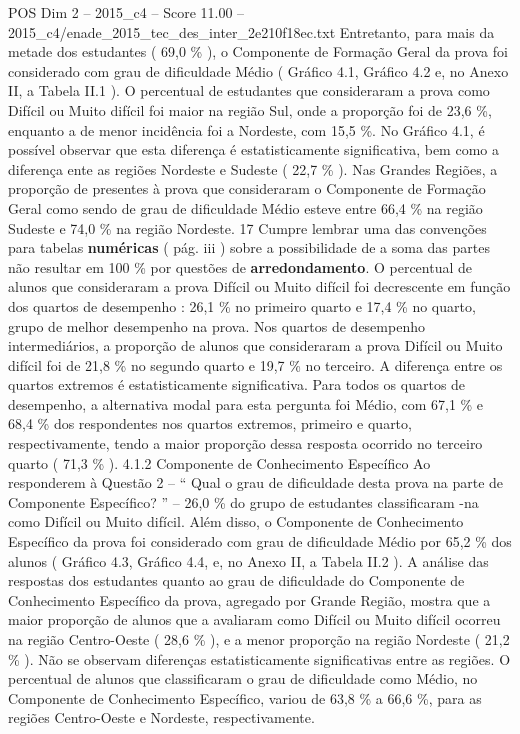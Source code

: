 \begin{textsample}{POS Dim 2 – 2015\_c4 – Score 11.00 – 2015\_c4/enade\_2015\_tec\_des\_inter\_2e210f18ec.txt}
Entretanto, para mais da metade dos estudantes ( 69,0 \% ), o Componente de Formação Geral da prova foi considerado com grau de dificuldade Médio ( Gráfico 4.1, Gráfico 4.2 e, no Anexo II, a Tabela II.1 ).
O percentual de estudantes que consideraram a prova como Difícil ou Muito difícil foi maior na região Sul, onde a proporção foi de 23,6 \%, enquanto a de menor incidência foi a Nordeste, com 15,5 \%.
No Gráfico 4.1, é possível observar que esta diferença é estatisticamente significativa, bem como a diferença ente as regiões Nordeste e Sudeste ( 22,7 \% ).
Nas Grandes Regiões, a proporção de presentes à prova que consideraram o Componente de Formação Geral como sendo de grau de dificuldade Médio esteve entre 66,4 \% na região Sudeste e 74,0 \% na região Nordeste. 17 Cumpre lembrar uma das convenções para tabelas \textbf{numéricas} ( pág. iii ) sobre a possibilidade de a soma das partes não resultar em 100 \% por questões de \textbf{arredondamento}.
O percentual de alunos que consideraram a prova Difícil ou Muito difícil foi decrescente em função dos quartos de desempenho : 26,1 \% no primeiro quarto e 17,4 \% no quarto, grupo de melhor desempenho na prova.
Nos quartos de desempenho intermediários, a proporção de alunos que consideraram a prova Difícil ou Muito difícil foi de 21,8 \% no segundo quarto e 19,7 \% no terceiro.
A diferença entre os quartos extremos é estatisticamente significativa.
Para todos os quartos de desempenho, a alternativa modal para esta pergunta foi Médio, com 67,1 \% e 68,4 \% dos respondentes nos quartos extremos, primeiro e quarto, respectivamente, tendo a maior proporção dessa resposta ocorrido no terceiro quarto ( 71,3 \% ). 4.1.2 Componente de Conhecimento Específico Ao responderem à Questão 2 – “ Qual o grau de dificuldade desta prova na parte de Componente Específico? ” – 26,0 \% do grupo de estudantes classificaram -na como Difícil ou Muito difícil.
Além disso, o Componente de Conhecimento Específico da prova foi considerado com grau de dificuldade Médio por 65,2 \% dos alunos ( Gráfico 4.3, Gráfico 4.4, e, no Anexo II, a Tabela II.2 ).
A análise das respostas dos estudantes quanto ao grau de dificuldade do Componente de Conhecimento Específico da prova, agregado por Grande Região, mostra que a maior proporção de alunos que a avaliaram como Difícil ou Muito difícil ocorreu na região Centro-Oeste ( 28,6 \% ), e a menor proporção na região Nordeste ( 21,2 \% ).
Não se observam diferenças estatisticamente significativas entre as regiões.
O percentual de alunos que classificaram o grau de dificuldade como Médio, no Componente de Conhecimento Específico, variou de 63,8 \% a 66,6 \%, para as regiões Centro-Oeste e Nordeste, respectivamente.

\end{textsample}
